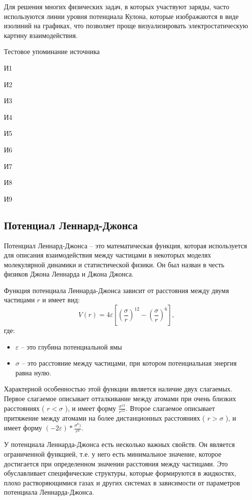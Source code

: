 Для решения многих физических задач, в которых участвуют заряды, часто используются линии уровня потенциала Кулона, которые изображаются в виде изолиний на графиках, что позволяет проще визуализировать электростатическую картину взаимодействия.

Тестовое упоминание источника \cite{test}

И1  \cite{ci500731a}

И2  \cite{biom10071056}

И3  \cite{doi:10.1007/978-1-4020-5295-8_1}

И4  \cite{chrushev}

И5  \cite{Voter}

И6  \cite{brooks}

И7  \cite{wu}

И8  \cite{rate, eef1}

И9 \cite{vcs}


\subsection{Потенциал Леннард-Джонса}

Потенциал Леннард-Джонса -- это математическая функция, которая используется для описания взаимодействия между частицами в некоторых моделях молекулярной динамики и статистической физики. Он был назван в честь физиков Джона Леннарда и Джона Джонса.

Функция потенциала Леннарда-Джонса зависит от расстояния между двумя частицами $r$ и имеет вид:
\[ V(r) = 4\varepsilon \left[ \left( \frac{\sigma}{r} \right)^{12} - \left( \frac{\sigma}{r} \right)^6 \right], \]
где:
\begin{itemize}
	\item $\varepsilon$ -- это глубина потенциальной ямы
	\item $\sigma$ -- это расстояние между частицами, при котором потенциальная энергия равна нулю.
\end{itemize}

Характерной особенностью этой функции является наличие двух слагаемых. Первое слагаемое описывает отталкивание между атомами при очень близких расстояниях ( $r < \sigma$ ), и имеет форму $\frac{\sigma^{12}}{r^{12}}$. Второе слагаемое описывает притяжение между атомами на более дистанционных расстояниях ( $r > \sigma$ ), и имеет форму $(-2\varepsilon) * \frac{\sigma^6)}{r^6}$.

У потенциала Леннарда-Джонса есть несколько важных свойств. Он является ограниченной функцией, т.е. у него есть минимальное значение, которое достигается при определенном значении расстояния между частицами. Это обуславливает специфические структуры, которые формируются в жидкостях, плохо растворяющимися газах и других системах в зависимости от параметров потенциала Леннарда-Джонса.

